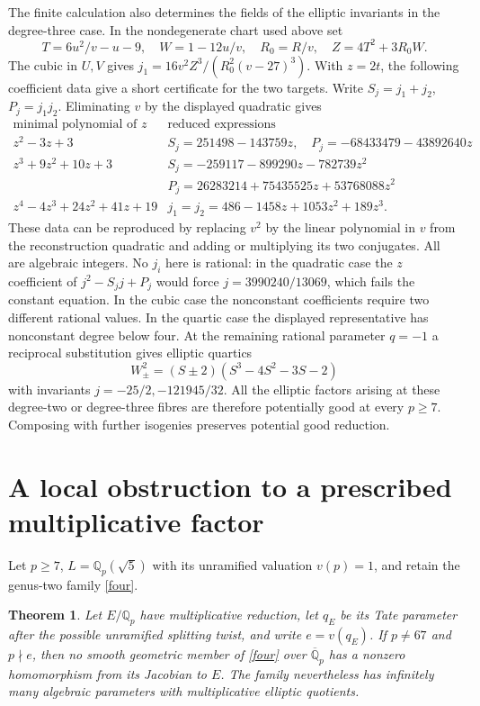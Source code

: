 \documentclass[11pt]{article}
\newtheorem{theorem}{Theorem}[section]
\newcommand{\Q}{\mathbb Q}
\begin{document}
The finite calculation also determines the fields of the elliptic
invariants in the degree-three case. In the nondegenerate chart used
above set
\[
 T=6u^2/v-u-9,\quad W=1-12u/v,\quad R_0=R/v,\quad
 Z=4T^2+3R_0W .
\]
The cubic in $U,V$ gives $j_1=16v^2 Z^3/(R_0^2(v-27)^3)$.
With $z=2t$, the following coefficient data give a short certificate
for the two targets. Write $S_j=j_1+j_2$, $P_j=j_1j_2$.
Eliminating $v$ by the displayed quadratic gives
\[
\begin{array}{c|l}
 \text{minimal polynomial of }z&\text{reduced expressions}\\ \hline
 z^2-3z+3&S_j=251498-143759z,\quad P_j=-68433479-43892640z\\
 z^3+9z^2+10z+3&S_j=-259117-899290z-782739z^2\\
   &P_j=26283214+75435525z+53768088z^2\\
 z^4-4z^3+24z^2+41z+19 &j_1=j_2=486-1458z+1053z^2+189z^3 .
\end{array}
\]
These data can be reproduced by replacing $v^2$ by the linear polynomial
in $v$ from the reconstruction quadratic and adding or multiplying its
two conjugates. All are algebraic integers. No $j_i$ here is rational:
in the quadratic case the $z$ coefficient of $j^2-S_jj+P_j$
would force $j=3990240/13069$, which fails the constant equation.
In the cubic case the nonconstant coefficients require two different
rational values. In the quartic case the displayed representative has
nonconstant degree below four. At the remaining rational parameter
$q=-1$ a reciprocal substitution gives elliptic quartics
\[
 W_\pm^2=(S\pm2)(S^3-4S^2-3S-2)
\]
with invariants $j=-25/2,-121945/32$. All the elliptic factors
arising at these degree-two or degree-three fibres are therefore
potentially good at every $p\ge7$. Composing with further isogenies
preserves potential good reduction.


\section{A local obstruction to a prescribed multiplicative factor}
Let $p\ge7$, $L=\Q_p(\sqrt5)$ with its unramified valuation $v(p)=1$,
and retain the genus-two family \eqref{four}.
\begin{theorem}\label{local}
Let $E/\Q_p$ have multiplicative reduction, let $q_E$ be its Tate
parameter after the possible unramified splitting twist, and write
$e=v(q_E)$. If $p\ne67$ and $p\nmid e$, then no smooth geometric
member of \eqref{four} over $\overline{\Q}_p$ has a nonzero homomorphism
from its Jacobian to $E$. The family nevertheless has infinitely many
algebraic parameters with multiplicative elliptic quotients.
\end{theorem}
\end{document}
